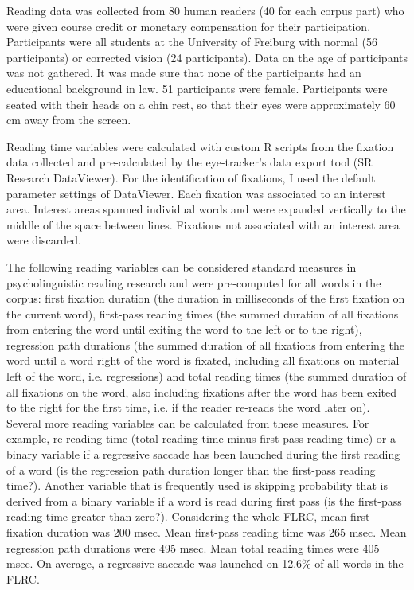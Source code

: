 \documentclass[output=paper]{langsci/langscibook}
\begin{document}
Reading data was collected from 80 human readers (40 for each corpus part) who were given course credit or monetary compensation for their participation. Participants were all students at the University of Freiburg with normal (56 participants) or corrected vision (24 participants). Data on the age of participants was not gathered. It was made sure that none of the participants had an educational background in law. 51 participants were female. Participants were seated with their heads on a chin rest, so that their eyes were approximately 60 cm away from the screen.

Reading time variables were calculated with custom R \citep{R2014} scripts from the fixation data collected and pre-calculated by the eye-tracker's data export tool (SR Research DataViewer). For the identification of fixations, I used the default parameter settings of DataViewer. Each fixation was associated to an interest area. Interest areas spanned individual words and were expanded vertically to the middle of the space between lines. Fixations not associated with an interest area were discarded.

The following reading variables can be considered standard measures in psycholinguistic reading research and were pre-computed for all words in the corpus: first fixation duration (the duration in milliseconds of the first fixation on the current word), first-pass reading times (the summed duration of all fixations from entering the word until exiting the word to the left or to the right), regression path durations (the summed duration of all fixations from entering the word until a word right of the word is fixated, including all fixations on material left of the word, i.e. regressions) and total reading times (the summed duration of all fixations on the word, also including fixations after the word has been exited to the right for the first time, i.e. if the reader re-reads the word later on). Several more reading variables can be calculated from these measures. For example, re-reading time (total reading time minus first-pass reading time) or a binary variable if a regressive saccade has been launched during the first reading of a word (is the regression path duration longer than the first-pass reading time?). Another variable that is frequently used is skipping probability that is derived from a binary variable if a word is read during first pass (is the first-pass reading time greater than zero?). Considering the whole FLRC, mean first fixation duration was 200 msec. Mean first-pass reading time was 265 msec. Mean regression path durations were 495 msec. Mean total reading times were 405 msec. On average, a regressive saccade was launched on 12.6\% of all words in the FLRC. 
\end{document}
